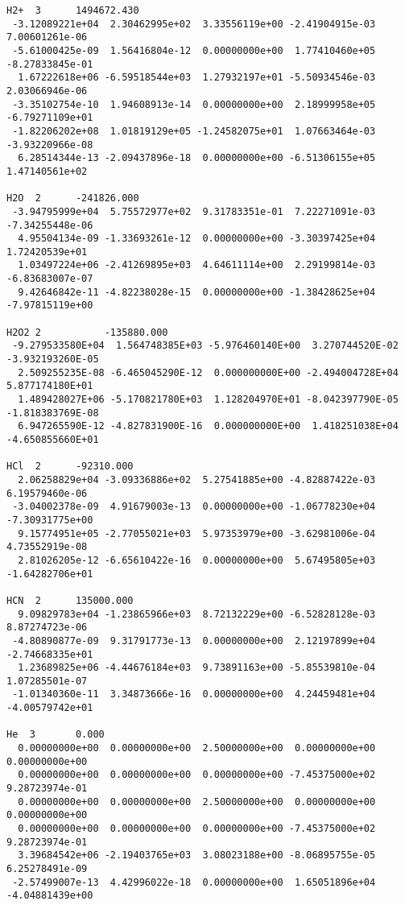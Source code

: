 \begin{verbatim}
H2+  3		1494672.430						         
 -3.12089221e+04  2.30462995e+02  3.33556119e+00 -2.41904915e-03  7.00601261e-06
 -5.61000425e-09  1.56416804e-12  0.00000000e+00  1.77410460e+05 -8.27833845e-01
  1.67222618e+06 -6.59518544e+03  1.27932197e+01 -5.50934546e-03  2.03066946e-06
 -3.35102754e-10  1.94608913e-14  0.00000000e+00  2.18999958e+05 -6.79271109e+01
 -1.82206202e+08  1.01819129e+05 -1.24582075e+01  1.07663464e-03 -3.93220966e-08
  6.28514344e-13 -2.09437896e-18  0.00000000e+00 -6.51306155e+05  1.47140561e+02
										 
H2O  2		-241826.000						         
 -3.94795999e+04  5.75572977e+02  9.31783351e-01  7.22271091e-03 -7.34255448e-06
  4.95504134e-09 -1.33693261e-12  0.00000000e+00 -3.30397425e+04  1.72420539e+01
  1.03497224e+06 -2.41269895e+03  4.64611114e+00  2.29199814e-03 -6.83683007e-07
  9.42646842e-11 -4.82238028e-15  0.00000000e+00 -1.38428625e+04 -7.97815119e+00
										 
H2O2 2           -135880.000                                                     
 -9.279533580E+04  1.564748385E+03 -5.976460140E+00  3.270744520E-02 -3.932193260E-05 
  2.509255235E-08 -6.465045290E-12  0.000000000E+00 -2.494004728E+04  5.877174180E+01 
  1.489428027E+06 -5.170821780E+03  1.128204970E+01 -8.042397790E-05 -1.818383769E-08 
  6.947265590E-12 -4.827831900E-16  0.000000000E+00  1.418251038E+04 -4.650855660E+01 
										 
HCl  2		-92310.000						         
  2.06258829e+04 -3.09336886e+02  5.27541885e+00 -4.82887422e-03  6.19579460e-06
 -3.04002378e-09  4.91679003e-13  0.00000000e+00 -1.06778230e+04 -7.30931775e+00
  9.15774951e+05 -2.77055021e+03  5.97353979e+00 -3.62981006e-04  4.73552919e-08
  2.81026205e-12 -6.65610422e-16  0.00000000e+00  5.67495805e+03 -1.64282706e+01
										 
HCN  2		135000.000						         
  9.09829783e+04 -1.23865966e+03  8.72132229e+00 -6.52828128e-03  8.87274723e-06
 -4.80890877e-09  9.31791773e-13  0.00000000e+00  2.12197899e+04 -2.74668335e+01
  1.23689825e+06 -4.44676184e+03  9.73891163e+00 -5.85539810e-04  1.07285501e-07
 -1.01340360e-11  3.34873666e-16  0.00000000e+00  4.24459481e+04 -4.00579742e+01
										 
He  3		0.000								 
  0.00000000e+00  0.00000000e+00  2.50000000e+00  0.00000000e+00  0.00000000e+00
  0.00000000e+00  0.00000000e+00  0.00000000e+00 -7.45375000e+02  9.28723974e-01
  0.00000000e+00  0.00000000e+00  2.50000000e+00  0.00000000e+00  0.00000000e+00
  0.00000000e+00  0.00000000e+00  0.00000000e+00 -7.45375000e+02  9.28723974e-01
  3.39684542e+06 -2.19403765e+03  3.08023188e+00 -8.06895755e-05  6.25278491e-09
 -2.57499007e-13  4.42996022e-18  0.00000000e+00  1.65051896e+04 -4.04881439e+00
										 

\end{verbatim}
